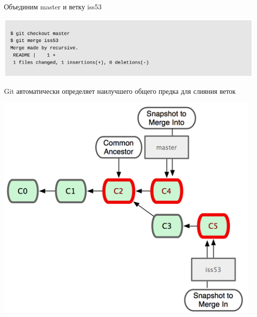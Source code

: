 \documentclass{beamer}
\begin{document}
\begin{frame}
\begin{block}{Объединим master и ветку iss53}
\begin{center}
\includegraphics[scale=0.4]{images/ex-16.png}
\end{center}
\end{block}
\begin{block}{Git автоматически определяет наилучшего общего предка для слияния веток}
\begin{center}
\includegraphics[scale=0.35]{images/ex-17.png}
\end{center}
\end{block}
\end{frame}
\end{document}
